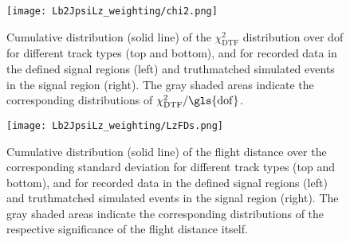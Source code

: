 \begin{figure}[htbp]
    \centering
    \texttt{[image: Lb2JpsiLz\_weighting/chi2.png]}
    \caption{Cumulative distribution (solid line) of the $\chi^2_\text{DTF}$ distribution over \gls{dof} for different track types (top and bottom), and for recorded data in the defined signal regions (left) and \gls{truthmatched} simulated events in the signal region (right). The gray shaded areas indicate the corresponding distributions of $\chi^2_\text{DTF}/\mathrm{\gls{dof}}$.}
    \label{fig:chi2dtf_LbToJpsiLz}
\end{figure}

\begin{figure}[htbp]
    \centering
    \texttt{[image: Lb2JpsiLz\_weighting/LzFDs.png]}
    \caption{Cumulative distribution (solid line) of the \Lz flight distance over the corresponding standard deviation for different track types (top and bottom), and for recorded data in the defined signal regions (left) and \gls{truthmatched} simulated events in the signal region (right). The gray shaded areas indicate the corresponding distributions of the respective significance of the flight distance itself.}
    \label{fig:LzFDs_LbToJpsiLz}
\end{figure}


